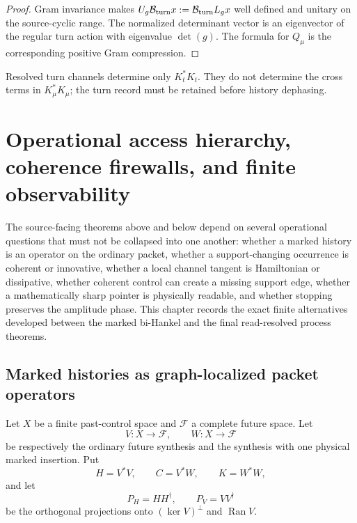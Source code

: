 \documentclass[11pt,oneside,openany]{book}
\numberwithin{equation}{chapter}
\theoremstyle{definition}
\theoremstyle{remark}
\newcommand{\Ran}{\operatorname{Ran}}
\begin{document}
\begin{proof}
Gram invariance makes
\(U_g\mathcal B_{\rm turn}x:=\mathcal B_{\rm turn}L_gx\) well defined and unitary
on the source-cyclic range.  The normalized determinant vector is an
eigenvector of the regular turn action with eigenvalue \(\det(g)\).  The formula
for \(Q_\mu\) is the corresponding positive Gram compression.
\end{proof}

Resolved turn channels determine only \(K_t^*K_t\).  They do not determine the
cross terms in \(K_\mu^*K_\mu\); the turn record must be retained before
history dephasing.

\chapter{Operational access hierarchy, coherence firewalls, and finite observability}
\label{ch:v6-access-hierarchy}

The source-facing theorems above and below depend on several operational
questions that must not be collapsed into one another: whether a marked
history is an operator on the ordinary packet, whether a support-changing
occurrence is coherent or innovative, whether a local channel tangent is
Hamiltonian or dissipative, whether coherent control can create a missing
support edge, whether a mathematically sharp pointer is physically readable,
and whether stopping preserves the amplitude phase.  This chapter records the
exact finite alternatives developed between the marked bi-Hankel and the final
read-resolved process theorems.

\section{Marked histories as graph-localized packet operators}

Let \(X\) be a finite past-control space and \(\mathcal F\) a complete future
space.  Let
\[
 V:X\longrightarrow\mathcal F,
 \qquad
 W:X\longrightarrow\mathcal F
\]
be respectively the ordinary future synthesis and the synthesis with one
physical marked insertion.  Put
\[
 H=V^*V,
 \qquad C=V^*W,
 \qquad K=W^*W,
\]
and let
\[
 P_H=HH^\dagger,
 \qquad P_V=VV^\dagger
\]
be the orthogonal projections onto \((\ker V)^\perp\) and \(\Ran V\).
\end{document}
